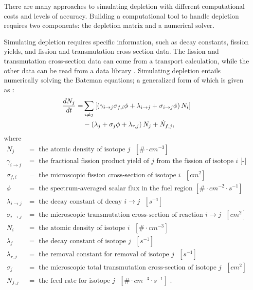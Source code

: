 There are many approaches to simulating depletion with different computational costs and levels of accuracy. Building a computational tool to handle depletion requires two components: the depletion matrix and a numerical solver.

Simulating depletion requires specific information, such as decay constants, fission yields, and fission and transmutation cross-section data.
The fission and transmutation cross-section data can come from a transport calculation, while the other data can be read from a data library \cite{leppanen_development_2007}.
Simulating depletion entails numerically solving the Bateman equations; a generalized form of which is given as  \cite{leppanen_development_2007}:
\begin{equation} \hfill
\begin{split}
\frac{dN_j}{dt} =& \sum_{i \neq j}  \left [ \left( \gamma_{i \rightarrow j} \sigma_{f, i} \phi + \lambda _{i \rightarrow j} + \sigma_{i \rightarrow j} \phi \right) N_i \right ]\\
 & - \left ( \lambda_j + \sigma_j \phi + \lambda_{r, j} \right) N_j + \dot{N}_{f, j},
\end{split}
\hfill\label{eq:Bateman_default} \end{equation}
where
\begin{align}
N_j &= \mbox{ the atomic density of isotope $j$ $\left[\# \cdot cm^{-3}\right]$ } \nonumber \\ 
\gamma_{i \rightarrow j} &= \mbox{ the fractional fission product yield of $j$ from the fission of isotope $i$ [-]} \nonumber \\ 
\sigma_{f, i} &= \mbox{ the microscopic fission cross-section of isotope $i$ $\left[cm^2\right]$ } \nonumber \\ 
\phi &= \mbox{ the spectrum-averaged scalar flux in the fuel region $\left[\# \cdot cm^{-2} \cdot s^{-1}\right]$ } \nonumber \\ 
\lambda _{i \rightarrow j} &= \mbox{ the decay constant of decay $i \rightarrow j$ $\left[s^{-1}\right]$ } \nonumber \\ 
\sigma_{i \rightarrow j} &= \mbox{ the microscopic transmutation cross-section of reaction $i \rightarrow j$ $\left[cm^2\right]$ } \nonumber \\ 
N_i &= \mbox{ the atomic density of isotope $i$ $\left[\# \cdot cm^{-3}\right]$ } \nonumber \\ 
\lambda_j &= \mbox{ the decay constant of isotope $j$ $\left[s^{-1}\right]$ } \nonumber \\ 
\lambda_{r, j} &= \mbox{ the removal constant for removal of isotope $j$ $\left[s^{-1}\right]$ } \nonumber \\ 
\sigma_j &= \mbox{ the microscopic total transmutation cross-section of isotope $j$ $\left[cm^2\right]$ } \nonumber \\ 
\dot{N}_{f, j} &= \mbox{ the feed rate for isotope $j$ $\left[\# \cdot cm^{-3} \cdot s^{-1}\right]$ .} \nonumber
\end{align}

